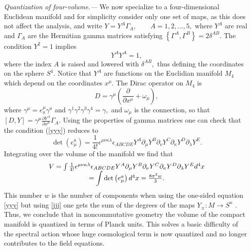 \documentclass
[twocolumn,prl,unsortedaddress,superscriptaddress,showpacs]{revtex4}%
\begin{document}
\emph{Quantization of four-volume.---}
We now specialize to a four-dimensional Euclidean manifold and for simplicity
consider only one set of maps, as this does not affect the analysis, and write
$Y=Y^{A}\Gamma_{A},\qquad A=1,2,...,5,$ where $Y^{A}$ are real and $\Gamma
_{A}$ are the Hermitian gamma matrices satisfying $\left\{  \Gamma^{A}%
,\Gamma^{B}\right\}  =2\delta^{AB}$. The condition $Y^{2}=1$ implies
\begin{equation}
Y^{A}Y^{A}=1, \label{4}%
\end{equation}
where the index $A$ is raised and lowered with $\delta^{AB},$ thus defining
the coordinates on the sphere $S^{4}.$ Notice that $Y^{A}$ are functions on
the Euclidian manifold $M_{4}$ which depend on the coordinates $x^{\mu}.$ The
Dirac operator on $M_{4}$ is
\begin{equation}
D=\gamma^{\mu}\left(  \frac{\partial}{\partial x^{\mu}}+\omega_{\mu}\right)  ,
\label{5}%
\end{equation}
where $\gamma^{\mu}=e_{a}^{\mu}\gamma^{a}$ and $\gamma^{1}\gamma^{2}\gamma
^{3}\gamma^{4}=\gamma,$ and $\omega_{\mu}$ is the connection, so that $\left[
D,Y\right]  =\gamma^{\mu}\frac{\partial Y^{A}}{\partial x^{\mu}}\Gamma_{A}.$
Using the properties of gamma matrices one can check that the condition
(\ref{yyy}) reduces to
\begin{equation}
\det\left(  e_{\mu}^{a}\right)  =\frac{1}{4!}\epsilon^{\mu\nu\kappa\lambda
}\epsilon_{ABCDE}Y^{A}\partial_{\mu}Y^{B}\partial_{\nu}Y^{C}\partial_{\kappa
}Y^{D}\partial_{\lambda}Y^{E}. \label{6}%
\end{equation}
Integrating over the volume of the manifold we find that%
\begin{equation}%
\begin{array}
[c]{c}%
V=\int\frac{1}{4!}\epsilon^{\mu\nu\kappa\lambda}\epsilon_{ABCDE}Y^{A}%
\partial_{\mu}Y^{B}\partial_{\nu}Y^{C}\partial_{\kappa}Y^{D}\partial_{\lambda
}Y^{E}d^{4}x\\
=%
{\displaystyle\int}
\det\left(  e_{\mu}^{a}\right)  d^{4}x=\frac{8\pi^{2}w}{3}.
\end{array}
\label{7}%
\end{equation}
This number $w$ is the number of components when using the one-sided equation
\eqref{yyy} but using \eqref{jjj} one gets the sum of the degrees of the maps
$Y_{\pm}:M\rightarrow S^{n}$ \cite{Greub}. Thus, we conclude that in
noncommutative geometry the volume of the compact manifold is quantized in
terms of Planck units. This solves a basic difficulty of the spectral action
\cite{AC} whose huge cosmological term is now quantized and no longer
contributes to the field equations.
\end{document}
